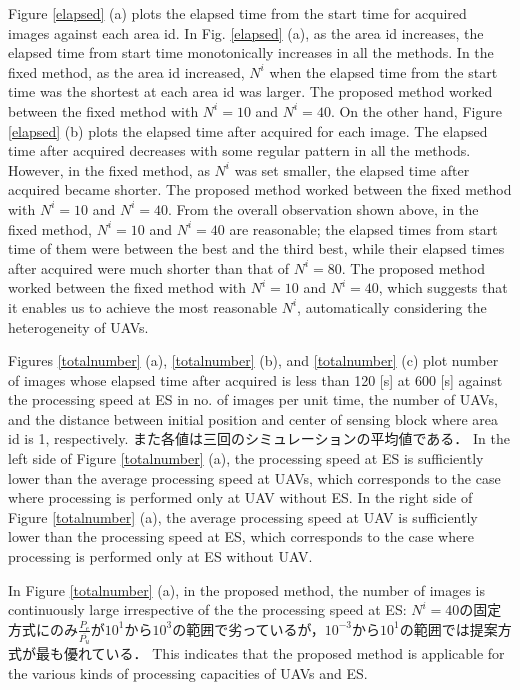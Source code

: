\documentclass{ieeeaccess}
\begin{document}
Figure \ref{elapsed} (a) plots the elapsed time from the start time for acquired images against each area id.
In Fig. \ref{elapsed} (a), as the area id increases, the elapsed time from start time monotonically increases in all the methods.
In the fixed method, as the area id increased, $N^i$ when the elapsed time from the start time was the shortest at each area id was larger.
The proposed method worked between the fixed method with $N^i=10$ and $N^i=40$.
%
On the other hand, Figure \ref{elapsed} (b) plots the elapsed time after acquired for each image.
The elapsed time after acquired decreases with some regular pattern in all the methods.
However, in the fixed method, as $N^i$ was set smaller, the elapsed time after acquired became shorter.
The proposed method worked between the fixed method with $N^i=10$ and $N^i=40$.
%
From the overall observation shown above, in the fixed method, $N^i=10$ and $N^i=40$ are reasonable; the elapsed times from start time of them were between the best and the third best, while their elapsed times after acquired were much shorter than that of $N^i=80$.
%
The proposed method worked between the fixed method with $N^i=10$ and $N^i=40$, which suggests that it enables us to achieve the most reasonable $N^i$, automatically considering the heterogeneity of UAVs.

Figures \ref{totalnumber} (a), \ref{totalnumber} (b), and \ref{totalnumber} (c) plot number of images whose elapsed time after acquired is less than 120 [s] at 600 [s] against the processing speed at ES in no. of images per unit time, the number of UAVs, and the distance between initial position and center of sensing block where area id is 1, respectively.
また各値は三回のシミュレーションの平均値である．
In the left side of Figure \ref{totalnumber} (a), the processing speed at ES is sufficiently lower than the average processing speed at UAVs, which corresponds to the case where processing is performed only at UAV without ES.
In the right side of Figure \ref{totalnumber} (a), the average processing speed at UAV is sufficiently lower than the processing speed at ES, which corresponds to the case where processing is performed only at ES without UAV.

In Figure \ref{totalnumber} (a), in the proposed method, the number of images is continuously large irrespective of the the processing speed at ES: $N^i=40$の固定方式にのみ$\frac{P_e}{\overline{P_u}}$が$10^1$から$10^3$の範囲で劣っているが，$10^{-3}$から$10^{1}$の範囲では提案方式が最も優れている．
This indicates that the proposed method is applicable for the various kinds of processing capacities of UAVs and ES.
\end{document}
